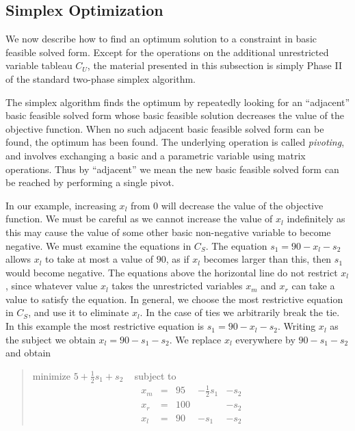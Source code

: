 \documentclass{article}
\begin{document}
\subsection{Simplex Optimization}
\label{simplex-optimization}

We now describe how to find an optimum solution to a constraint in basic
feasible solved form.  Except for the operations on the additional
unrestricted variable tableau $C_U$, the material presented in this
subsection is simply Phase II of the standard two-phase simplex algorithm.

The simplex algorithm finds the optimum by repeatedly looking for an
``adjacent'' basic feasible solved form whose basic feasible solution
decreases the value of the objective function.  When no such adjacent basic
feasible solved form can be found, the optimum has been found.  The
underlying operation is called \emph{pivoting}, and involves exchanging a
basic and a parametric variable using matrix operations.  Thus by
``adjacent'' we mean the new basic feasible solved form can be reached by
performing a single pivot.

In our example, increasing $x_l$ from $0$ will decrease the value of the
objective function.  We must be careful as we cannot increase the value of
$x_l$ indefinitely as this may cause the value of some other
basic non-negative variable to become negative.  We must examine the
equations in $C_S$\@.  The equation $s_1 = 90 - x_l - s_2$ allows $x_l$ to
take at most a value of $90$, as if $x_l$ becomes larger than this, then
$s_1$ would become negative.  The equations above the horizontal line do not
restrict $x_l$, since whatever value $x_l$ takes the unrestricted variables
$x_m$ and $x_r$ can take a value to satisfy the equation.  In general,
we choose the most restrictive equation in $C_S$, and use it to eliminate
$x_l$.  In the case of ties we arbitrarily break the tie. In this example
the most restrictive equation is $s_1 = 90 - x_l - s_2$.  Writing $x_l$ as
the subject we obtain $x_l = 90 - s_1 - s_2$.  We replace $x_l$ everywhere
by $90 - s_1 - s_2$ and obtain
\begin{quote}\vspace*{-1ex}
minimize $5 + \frac{1}{2} s_1 + s_2$ 
~ subject to 
$$
\begin{array}{rlrrr} 
x_m & = &95 & - \frac{1}{2} s_1 & - s_2 \\
x_r & = &100 &  & - s_2 \\ \hline
x_l & = &90 & - s_1 & - s_2 
\end{array}
$$
\end{quote}\vspace{-0.9ex}
\end{document}
